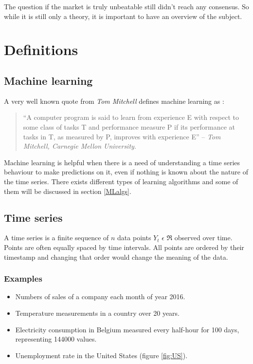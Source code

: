 \documentclass[11pt,a4paper,oneside]{book}
\newenvironment{myitemize}
{ \begin{itemize}
    \setlength\itemsep{0pt}}
{ \end{itemize}                  }
\begin{document}
The question if the market is truly unbeatable still didn't reach any consensus. So while it is still only a theory, it is important to have an overview of the subject. 


\section{Definitions}


\subsection{Machine learning}

A very well known quote from \textit{Tom Mitchell} defines machine learning as : 

\vspace*{\fill} 
\begin{quote} 
\centering 
``A computer program is said to learn from experience E with respect to some class of tasks T and performance measure P if its performance at tasks in T, as measured by P, improves with experience E'' -- \textit{Tom Mitchell, Carnegie Mellon University}. 
\end{quote}
\vspace*{\fill}


Machine learning is helpful when there is a need of understanding a time series behaviour to make predictions on it, even if nothing is known about the nature of the time series. There exists different types of learning algorithms and some of them will be discussed in section \ref{MLalgs}.


\subsection{Time series}

A time series is a finite sequence of $n$ data points $Y_{t}$ $\epsilon$ $\Re$ observed over time. Points are often equally spaced by time intervals. All points are ordered by their timestamp and changing that order would change the meaning of the data. \cite{hyndman}

\subsubsection{Examples}

\begin{myitemize}
    \item Numbers of sales of a company each month of year 2016.
    \item Temperature measurements in a country over 20 years.
    \item Electricity consumption in Belgium measured every half-hour for 100 days, representing 144000 values.
    \item Unemployment rate in the United States (figure \ref{fig:US}).
\end{myitemize}
\end{document}
